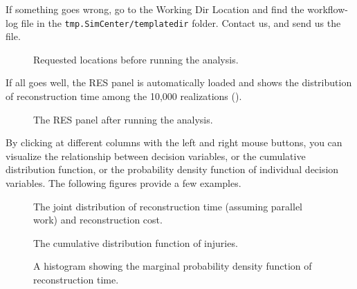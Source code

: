 If something goes wrong, go to the Working Dir Location and find the workflow-log file in the \texttt{tmp.SimCenter/templatedir} folder. Contact us, and send us the file.\\

\begin{figure}[!htbp]
  \caption{Requested locations before running the analysis.}
  \label{fig:ex_1_RUN}
\end{figure}

If all goes well, the RES panel is automatically loaded and shows the distribution of reconstruction time among the 10,000 realizations ().\\

\begin{figure}[!htbp]
  \caption{The RES panel after running the analysis.}
  \label{fig:ex_1_RES_1}
\end{figure}

By clicking at different columns with the left and right mouse buttons, you can visualize the relationship between decision variables, or the cumulative distribution function, or the probability density function of individual decision variables. The following figures provide a few examples.

\begin{figure}[!htbp]
  \caption{The joint distribution of reconstruction time (assuming parallel work) and reconstruction cost.}
  \label{fig:ex_1_RES_2}
\end{figure}

\begin{figure}[!htbp]
  \caption{The cumulative distribution function of injuries.}
  \label{fig:ex_1_RES_3}
\end{figure}

\begin{figure}[!htbp]
  \caption{A histogram showing the marginal probability density function of reconstruction time.}
  \label{fig:ex_1_RES_4}
\end{figure}